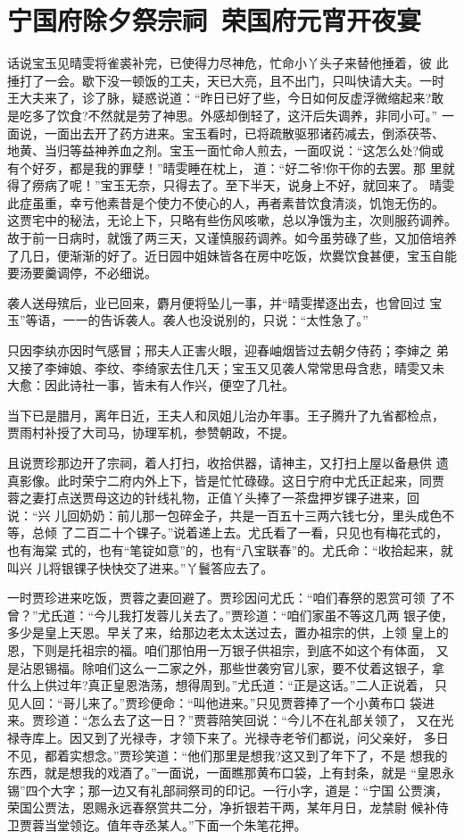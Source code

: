 \chapter{宁国府除夕祭宗祠~荣国府元宵开夜宴}

话说宝玉见晴雯将雀裘补完，已使得力尽神危，忙命小丫头子来替他捶着，彼
此捶打了一会。歇下没一顿饭的工夫，天已大亮，且不出门，只叫快请大夫。一时
王大夫来了，诊了脉，疑惑说道：“昨日已好了些，今日如何反虚浮微缩起来?敢
是吃多了饮食?不然就是劳了神思。外感却倒轻了，这汗后失调养，非同小可。”
一面说，一面出去开了药方进来。宝玉看时，已将疏散驱邪诸药减去，倒添茯苓、
地黄、当归等益神养血之剂。宝玉一面忙命人煎去，一面叹说：“这怎么处?倘或
有个好歹，都是我的罪孽！”晴雯睡在枕上，道：“好二爷!你干你的去罢。那
里就得了痨病了呢！”宝玉无奈，只得去了。至下半天，说身上不好，就回来了。
晴雯此症虽重，幸亏他素昔是个使力不使心的人，再者素昔饮食清淡，饥饱无伤的。
这贾宅中的秘法，无论上下，只略有些伤风咳嗽，总以净饿为主，次则服药调养。
故于前一日病时，就饿了两三天，又谨慎服药调养。如今虽劳碌了些，又加倍培养
了几日，便渐渐的好了。近日园中姐妹皆各在房中吃饭，炊爨饮食甚便，宝玉自能
要汤要羹调停，不必细说。

袭人送母殡后，业已回来，麝月便将坠儿一事，并“晴雯撵逐出去，也曾回过
宝玉”等语，一一的告诉袭人。袭人也没说别的，只说：“太性急了。”

只因李纨亦因时气感冒；邢夫人正害火眼，迎春岫烟皆过去朝夕侍药；李婶之
弟又接了李婶娘、李纹、李绮家去住几天；宝玉又见袭人常常思母含悲，晴雯又未
大愈：因此诗社一事，皆未有人作兴，便空了几社。

当下已是腊月，离年日近，王夫人和凤姐儿治办年事。王子腾升了九省都检点，
贾雨村补授了大司马，协理军机，参赞朝政，不提。

且说贾珍那边开了宗祠，着人打扫，收拾供器，请神主，又打扫上屋以备悬供
遗真影像。此时荣宁二府内外上下，皆是忙忙碌碌。这日宁府中尤氏正起来，同贾
蓉之妻打点送贾母这边的针线礼物，正值丫头捧了一茶盘押岁锞子进来，回说：“兴
儿回奶奶：前儿那一包碎金子，共是一百五十三两六钱七分，里头成色不等，总倾
了二百二十个锞子。”说着递上去。尤氏看了一看，只见也有梅花式的，也有海棠
式的，也有“笔锭如意”的，也有“八宝联春”的。尤氏命：“收拾起来，就叫兴
儿将银锞子快快交了进来。”丫鬟答应去了。

一时贾珍进来吃饭，贾蓉之妻回避了。贾珍因问尤氏：“咱们春祭的恩赏可领
了不曾？”尤氏道：“今儿我打发蓉儿关去了。”贾珍道：“咱们家虽不等这几两
银子使，多少是皇上天恩。早关了来，给那边老太太送过去，置办祖宗的供，上领
皇上的恩，下则是托祖宗的福。咱们那怕用一万银子供祖宗，到底不如这个有体面，
又是沾恩锡福。除咱们这么一二家之外，那些世袭穷官儿家，要不仗着这银子，拿
什么上供过年?真正皇恩浩荡，想得周到。”尤氏道：“正是这话。”二人正说着，
只见人回：“哥儿来了。”贾珍便命：“叫他进来。”只见贾蓉捧了一个小黄布口
袋进来。贾珍道：“怎么去了这一日？”贾蓉陪笑回说：“今儿不在礼部关领了，
又在光禄寺库上。因又到了光禄寺，才领下来了。光禄寺老爷们都说，问父亲好，
多日不见，都着实想念。”贾珍笑道：“他们那里是想我?这又到了年下了，不是
想我的东西，就是想我的戏酒了。”一面说，一面瞧那黄布口袋，上有封条，就是
“皇恩永锡”四个大字；那一边又有礼部祠祭司的印记。一行小字，道是：“宁国
公贾演，荣国公贾法，恩赐永远春祭赏共二分，净折银若干两，某年月日，龙禁尉
候补侍卫贾蓉当堂领讫。值年寺丞某人。”下面一个朱笔花押。

